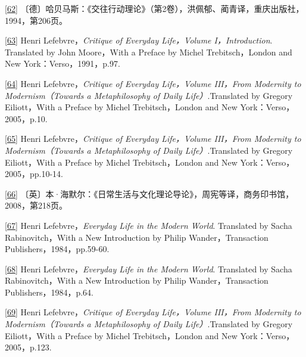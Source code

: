\documentclass[UTF8, fontset = sourcesans, a4paper, oneside, zihao =
-4, scheme=chinese, no-math, space=true]{ctexbook}
\begin{document}
\protect\hypertarget{part0007_split_004.htmlux5cux23m62}{}{}\protect\hyperlink{part0007_split_004.htmlux5cux23w62}{{[}62{]}}
〔德〕哈贝马斯：《交往行动理论》（第2卷），洪佩郁、蔺青译，重庆出版社，1994，第206页。

\protect\hypertarget{part0007_split_004.htmlux5cux23m63}{}{}\protect\hyperlink{part0007_split_004.htmlux5cux23w63}{{[}63{]}}
Henri Lefebvre，\emph{Critique of Everyday Life，Volume
I，Introduction}. Translated by John Moore，With a Preface by Michel
Trebitsch，London and New York：Verso，1991，p.97.

\protect\hypertarget{part0007_split_004.htmlux5cux23m64}{}{}\protect\hyperlink{part0007_split_004.htmlux5cux23w64}{{[}64{]}}
Henri Lefebvre，\emph{Critique of Everyday Life，Volume III，From
Modernity to Modernism（Towards a Metaphilosophy of Daily
Life）}.Translated by Gregory Eiliott，With a Preface by Michel
Trebitsch，London and New York：Verso，2005，p.10.

\protect\hypertarget{part0007_split_004.htmlux5cux23m65}{}{}\protect\hyperlink{part0007_split_004.htmlux5cux23w65}{{[}65{]}}
Henri Lefebvre，\emph{Critique of Everyday Life，Volume III，From
Modernity to Modernism（Towards a Metaphilosophy of Daily
Life）}.Translated by Gregory Eiliott，With a Preface by Michel
Trebitsch，London and New York：Verso，2005，pp.10-14.

\protect\hypertarget{part0007_split_004.htmlux5cux23m66}{}{}\protect\hyperlink{part0007_split_004.htmlux5cux23w66}{{[}66{]}}
〔英〕本·海默尔：《日常生活与文化理论导论》，周宪等译，商务印书馆，2008，第218页。

\protect\hypertarget{part0007_split_004.htmlux5cux23m67}{}{}\protect\hyperlink{part0007_split_004.htmlux5cux23w67}{{[}67{]}}
Henri Lefebvre，\emph{Everyday Life in the Modern World}. Translated by
Sacha Rabinovitch，With a New Introduction by Philip Wander，Transaction
Publishers，1984，pp.59-60.

\protect\hypertarget{part0007_split_004.htmlux5cux23m68}{}{}\protect\hyperlink{part0007_split_004.htmlux5cux23w68}{{[}68{]}}
Henri Lefebvre，\emph{Everyday Life in the Modern World}. Translated by
Sacha Rabinovitch，With a New Introduction by Philip Wander，Transaction
Publishers，1984，p.64.

\protect\hypertarget{part0007_split_004.htmlux5cux23m69}{}{}\protect\hyperlink{part0007_split_004.htmlux5cux23w69}{{[}69{]}}
Henri Lefebvre，\emph{Critique of Everyday Life，Volume III，From
Modernity to Modernism（Towards a Metaphilosophy of Daily
Life）}.Translated by Gregory Eiliott，With a Preface by Michel
Trebitsch，London and New York：Verso，2005，p.123.
\end{document}
